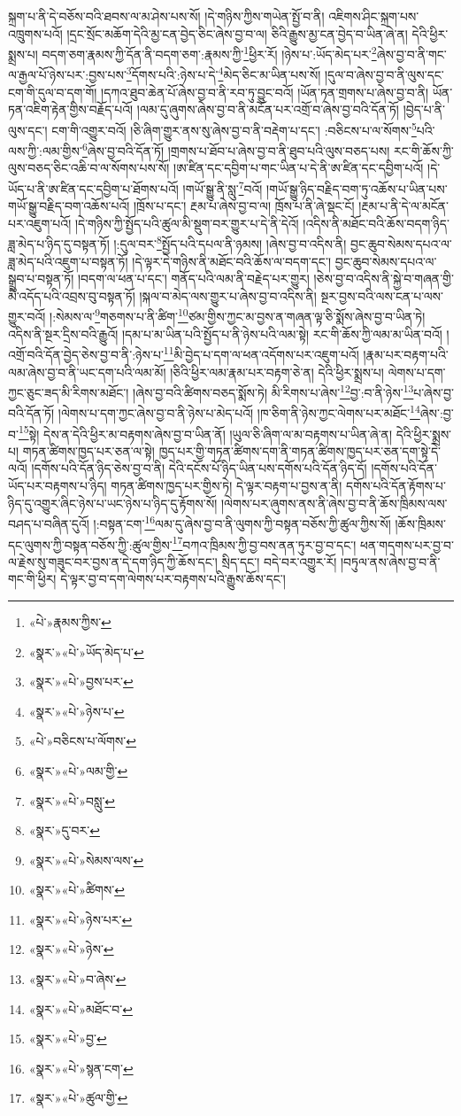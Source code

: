 སྐྲག་པ་ནི་དེ་བཅོས་བའི་ཐབས་ལ་མ་ཤེས་པས་སོ། །དེ་གཉིས་ཀྱིས་གཡེན་སྤྱོ་བ་ནི། འཇིགས་ཤིང་སྐྲག་པས་འཁྲུགས་པའོ། །དྲང་སྲོང་མཆོག་དེའི་མྱ་ངན་བྱེད་ཅིང་ཞེས་བྱ་བ་ལ། ཅིའི་རྒྱུས་མྱ་ངན་བྱེད་བ་ཡིན་ཞེ་ན། དེའི་ཕྱིར་སྨྲས་པ། བདག་ཅག་རྣམས་ཀྱི་དོན་ནི་བདག་ཅག་:རྣམས་ཀྱི་\footnote{«པེ་»རྣམས་ཀྱིས་}ཕྱིར་རོ། །ཉེས་པ་:ཡོད་མེད་པར་\footnote{«སྣར་»«པེ་»ཡོད་མེད་པ་}ཞེས་བྱ་བ་ནི་གང་ལ་རྒྱལ་པོ་ཉེས་པར་:བྱས་པས་\footnote{«སྣར་»«པེ་»བྱས་པར་}དོགས་པའི་:ཉེས་པ་དེ་\footnote{«སྣར་»«པེ་»ཉེས་པ་}མེད་ཅིང་མ་ཡིན་པས་སོ། །དུལ་བ་ཞེས་བྱ་བ་ནི་ལུས་དང་ངག་གི་དུལ་བ་དག་གོ། །དཀའ་ཐུབ་ཆེན་པོ་ཞེས་བྱ་བ་ནི་རབ་ཏུ་བྱུང་བའོ། །ཡོན་ཏན་གྲགས་པ་ཞེས་བྱ་བ་ནི། ཡོན་ཏན་འཇིག་རྟེན་གྱིས་བརྗོད་པའོ། །ལམ་དུ་ཞུགས་ཞེས་བྱ་བ་ནི་མངོན་པར་འགྲོ་བ་ཞེས་བྱ་བའི་དོན་ཏོ། །བྱེད་པ་ནི་ལུས་དང་། ངག་གི་འགྱུར་བའོ། །ཅི་ཞིག་གྱུར་ནས་སུ་ཞེས་བྱ་བ་ནི་བརྡེག་པ་དང་། :བཅིངས་པ་ལ་སོགས་\footnote{«པེ་»བཅིངས་པ་ལོགས་}པའི་ལས་ཀྱི་:ལམ་གྱིས་\footnote{«སྣར་»«པེ་»ལམ་གྱི་}ཞེས་བྱ་བའི་དོན་ཏོ། །གྲགས་པ་ཐོབ་པ་ཞེས་བྱ་བ་ནི་ཐུབ་པའི་ལུས་བཅད་པས། རང་གི་ཆོས་ཀྱི་ལུས་བཅད་ཅིང་འཆི་བ་ལ་སོགས་པས་སོ། །ཨ་ཛིན་དང་དབྱིག་པ་གང་ཡིན་པ་དེ་ནི་ཨ་ཛིན་དང་དབྱིག་པའོ། །དེ་ཡོད་པ་ནི་ཨ་ཛིན་དང་དབྱིག་པ་ཐོགས་པའོ། །གཡོ་སྒྱུ་ནི་སླུ་\footnote{«སྣར་»«པེ་»བསླུ་}བའོ། །གཡོ་སྒྱུ་ཉིད་བརྗིད་བག་ཏུ་འཆོས་པ་ཡིན་པས་གཡོ་སྒྱུ་བརྗིད་བག་འཆོས་པའོ། །ཁྲོས་པ་དང་། རྔམ་པ་ཞེས་བྱ་བ་ལ། ཁྲོས་པ་ནི་ཞེ་སྡང་ངོ། །རྔམ་པ་ནི་དེ་ལ་མངོན་པར་འཇུག་པའོ། །དེ་གཉིས་ཀྱི་སྤྱོད་པའི་ཚུལ་མི་སྡུག་བར་གྱུར་པ་དེ་ནི་དེའོ། །འདིས་ནི་མཐོང་བའི་ཆོས་བདག་ཉིད་ཟླ་མེད་པ་ཉིད་དུ་བསྟན་ཏོ། །:དུལ་བར་\footnote{«སྣར་»དུ་བར་}སྤྱོད་པའི་དཔལ་ནི་ཉམས། །ཞེས་བྱ་བ་འདིས་ནི། བྱང་ཆུབ་སེམས་དཔའ་ལ་ཟླ་མེད་པའི་འཇུག་པ་བསྟན་ཏོ། །དེ་ལྟར་དེ་གཉིས་ནི་མཐོང་བའི་ཆོས་ལ་བདག་དང་། བྱང་ཆུབ་སེམས་དཔའ་ལ་སྒྲུབ་པ་བསྟན་ཏོ། །བདག་ལ་ཕན་པ་དང་། གནོད་པའི་ལམ་ནི་བརྗེད་པར་གྱུར། །ཅེས་བྱ་བ་འདིས་ནི་སྐྱེ་བ་གཞན་གྱི་མི་འདོད་པའི་འབྲས་བུ་བསྟན་ཏོ། །སྐལ་བ་མེད་ལས་གྱུར་པ་ཞེས་བྱ་བ་འདིས་ནི། སྔར་བྱས་བའི་ལས་ངན་པ་ལས་གྱུར་བའོ། །:སེམས་ལ་\footnote{«སྣར་»«པེ་»སེམས་ལས་}གཅགས་པ་ནི་ཚིག་\footnote{«སྣར་»«པེ་»ཚིགས་}ཙམ་གྱིས་ཀྱང་མ་བྱས་ན་གཞན་ལྟ་ཅི་སྨོས་ཞེས་བྱ་བ་ཡིན་ཏེ། འདིས་ནི་སྔར་དྲིས་བའི་རྒྱུའོ། །དམ་པ་མ་ཡིན་པའི་སྤྱོད་པ་ནི་ཉེས་པའི་ལམ་སྟེ། རང་གི་ཆོས་ཀྱི་ལམ་མ་ཡིན་བའོ། །འགྲོ་བའི་དོན་བྱེད་ཅེས་བྱ་བ་ནི་:ཉེས་པ་\footnote{«སྣར་»«པེ་»ཉེས་པར་}མི་བྱེད་པ་དག་ལ་ཕན་འདོགས་པར་འཇུག་པའོ། །རྣམ་པར་བརྟག་པའི་ལམ་ཞེས་བྱ་བ་ནི་ཡང་དག་པའི་ལམ་མོ། །ཅིའི་ཕྱིར་ལམ་རྣམ་པར་བརྟག་ཅེ་ན། དེའི་ཕྱིར་སྨྲས་པ། ལེགས་པ་དག་ཀྱང་ཅུང་ཟད་མི་རིགས་མཐོང་། །ཞེས་བྱ་བའི་ཚིགས་བཅད་སྨོས་ཏེ། མི་རིགས་པ་ཞེས་\footnote{«སྣར་»«པེ་»ཉེས་}བྱ་:བ་ནི་ཉེས་\footnote{«སྣར་»«པེ་»བ་ཞེས་}པ་ཞེས་བྱ་བའི་དོན་ཏོ། །ལེགས་པ་དག་ཀྱང་ཞེས་བྱ་བ་ནི་ཉེས་པ་མེད་པའོ། །ཁ་ཅིག་ནི་ཉེས་ཀྱང་ལེགས་པར་མཐོང་\footnote{«སྣར་»«པེ་»མཐོང་བ་}ཞེས་:བྱ་བ་\footnote{«སྣར་»«པེ་»བྱ་}སྟེ། དེས་ན་དེའི་ཕྱིར་མ་བརྟགས་ཞེས་བྱ་བ་ཡིན་ནོ། །ཡུལ་ཅི་ཞིག་ལ་མ་བརྟགས་པ་ཡིན་ཞེ་ན། དེའི་ཕྱིར་སྨྲས་པ། གཏན་ཚིགས་ཁྱད་པར་ཅན་ལ་སྟེ། ཁྱད་པར་གྱི་གཏན་ཚིགས་དག་ནི་གཏན་ཚིགས་ཁྱད་པར་ཅན་དག་སྟེ་དེ་ལའོ། །དགོས་པའི་དོན་ཉིད་ཅེས་བྱ་བ་ནི། དེའི་དངོས་པོ་ཉིད་ཡིན་པས་དགོས་པའི་དོན་ཉིད་དོ། །དགོས་པའི་དོན་ཡོད་པར་བརྟགས་པ་ཉིད། གཏན་ཚིགས་ཁྱད་པར་གྱིས་ཏེ། དེ་ལྟར་བརྟག་པ་བྱས་ན་ནི། དགོས་པའི་དོན་རྟོགས་པ་ཉིད་དུ་འགྱུར་ཞིང་ཉེས་པ་ཡང་ཉེས་པ་ཉིད་དུ་རྟོགས་སོ། །ལེགས་པར་ཞུགས་ནས་ནི་ཞེས་བྱ་བ་ནི་ཆོས་ཁྲིམས་ལས་བཤད་པ་བཞིན་དུའོ། །:བསྟན་ངག་\footnote{«སྣར་»«པེ་»སྙན་ངག་}ལམ་དུ་ཞེས་བྱ་བ་ནི་ལུགས་ཀྱི་བསྟན་བཅོས་ཀྱི་ཚུལ་ཀྱིས་སོ། །ཆོས་ཁྲིམས་དང་ལུགས་ཀྱི་བསྟན་བཅོས་ཀྱི་:ཚུལ་གྱིས་\footnote{«སྣར་»«པེ་»ཚུལ་གྱི་}བཀའ་ཁྲིམས་ཀྱི་བྱ་བས་ནན་ཏུར་བྱ་བ་དང་། ཕན་གདགས་པར་བྱ་བ་ལ་རྗེས་སུ་གཟུང་བར་བྱས་ན་དེ་དག་ཉིད་ཀྱི་ཆོས་དང་། སྲིད་དང་། བདེ་བར་འགྱུར་རོ། །བཏུལ་ནས་ཞེས་བྱ་བ་ནི་གང་གི་ཕྱིར། དེ་ལྟར་བྱ་བ་དག་ལེགས་པར་བརྟགས་པའི་རྒྱུས་ཆོས་དང་། 